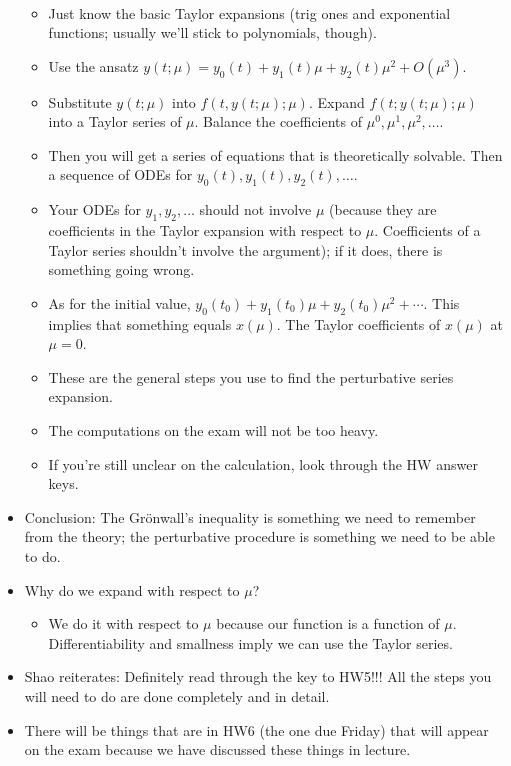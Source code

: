 \documentclass[../notes.tex]{subfiles}
\begin{document}
\begin{itemize}
\begin{itemize}
\begin{align*}
        \end{align*}
        \item Just know the basic Taylor expansions (trig ones and exponential functions; usually we'll stick to polynomials, though).
        \item Use the ansatz $y(t;\mu)=y_0(t)+y_1(t)\mu+y_2(t)\mu^2+O(\mu^3)$.
        \item Substitute $y(t;\mu)$ into $f(t,y(t;\mu);\mu)$. Expand $f(t;y(t;\mu);\mu)$ into a Taylor series of $\mu$. Balance the coefficients of $\mu^0,\mu^1,\mu^2,\dots$.
        \item Then you will get a series of equations that is theoretically solvable. Then a sequence of ODEs for $y_0(t),y_1(t),y_2(t),\dots$.
        \item Your ODEs for $y_1,y_2,\dots$ should not involve $\mu$ (because they are coefficients in the Taylor expansion with respect to $\mu$. Coefficients of a Taylor series shouldn't involve the argument); if it does, there is something going wrong.
        \item As for the initial value, $y_0(t_0)+y_1(t_0)\mu+y_2(t_0)\mu^2+\cdots$. This implies that something equals $x(\mu)$. The Taylor coefficients of $x(\mu)$ at $\mu=0$.
        \item These are the general steps you use to find the perturbative series expansion.
        \item The computations on the exam will not be too heavy.
        \item If you're still unclear on the calculation, look through the HW answer keys.
    \end{itemize}
    \item Conclusion: The Gr\"{o}nwall's inequality is something we need to remember from the theory; the perturbative procedure is something we need to be able to do.
    \item Why do we expand with respect to $\mu$?
    \begin{itemize}
        \item We do it with respect to $\mu$ because our function is a function of $\mu$. Differentiability and smallness imply we can use the Taylor series.
    \end{itemize}
    \item Shao reiterates: Definitely read through the key to HW5!!! All the steps you will need to do are done completely and in detail.
    \item There will be things that are in HW6 (the one due Friday) that will appear on the exam because we have discussed these things in lecture.

\end{itemize}
\end{document}
